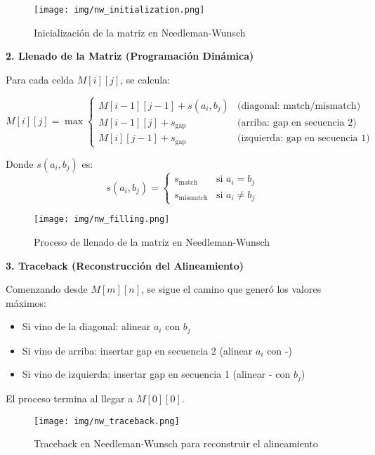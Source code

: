 \documentclass[12pt,a4paper]{article}
\begin{document}
\begin{figure}[H]
\centering
\texttt{[image: img/nw\_initialization.png]}
\caption{Inicialización de la matriz en Needleman-Wunsch}
\label{fig:nw_init}
\end{figure}

\textbf{2. Llenado de la Matriz (Programación Dinámica)}

Para cada celda $M[i][j]$, se calcula:

\begin{equation}
M[i][j] = \max \begin{cases}
M[i-1][j-1] + s(a_i, b_j) & \text{(diagonal: match/mismatch)} \\
M[i-1][j] + s_{\text{gap}} & \text{(arriba: gap en secuencia 2)} \\
M[i][j-1] + s_{\text{gap}} & \text{(izquierda: gap en secuencia 1)}
\end{cases}
\end{equation}

Donde $s(a_i, b_j)$ es:
\begin{equation}
s(a_i, b_j) = \begin{cases}
s_{\text{match}} & \text{si } a_i = b_j \\
s_{\text{mismatch}} & \text{si } a_i \neq b_j
\end{cases}
\end{equation}

\begin{figure}[H]
\centering
\texttt{[image: img/nw\_filling.png]}
\caption{Proceso de llenado de la matriz en Needleman-Wunsch}
\label{fig:nw_fill}
\end{figure}

\textbf{3. Traceback (Reconstrucción del Alineamiento)}

Comenzando desde $M[m][n]$, se sigue el camino que generó los valores máximos:

\begin{itemize}
    \item Si vino de la diagonal: alinear $a_i$ con $b_j$
    \item Si vino de arriba: insertar gap en secuencia 2 (alinear $a_i$ con -)
    \item Si vino de izquierda: insertar gap en secuencia 1 (alinear - con $b_j$)
\end{itemize}

El proceso termina al llegar a $M[0][0]$.

\begin{figure}[H]
\centering
\texttt{[image: img/nw\_traceback.png]}
\caption{Traceback en Needleman-Wunsch para reconstruir el alineamiento}
\label{fig:nw_traceback}
\end{figure}
\end{document}

